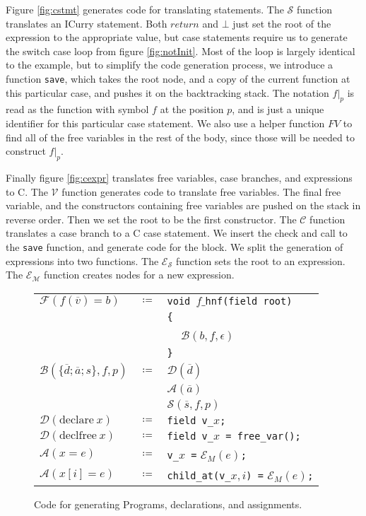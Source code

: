 \documentclass{book}
\theoremstyle{definition}
\newcommand{\Varid}[1]{\mathit{#1}}
\begin{document}
Figure \ref{fig:cstmt} generates code for translating statements.
The $\mathcal{S}$ function translates an ICurry statement.
Both \ensuremath{\Varid{return}} and \ensuremath{\bot } just set the root of the expression to the appropriate value,
but case statements require us to generate the switch case loop from figure \ref{fig:notInit}.
Most of the loop is largely identical to the example,
but to simplify the code generation process, we introduce a function \texttt{save},
which takes the root node, and a copy of the current function at this particular case,
and pushes it on the backtracking stack.
The notation $f\vert_p$ is read as the function with symbol $f$ at the position $p$,
and is just a unique identifier for this particular case statement.
We also use a helper function $FV$ to find all of the free variables in the rest of the body,
since those will be needed to construct $f\vert_p$.

Finally figure \ref{fig:cexpr} translates free variables, case branches, and expressions to C.
The $\mathcal{V}$  function generates code to translate free variables.
The final free variable, and the constructors containing free variables 
are pushed on the stack in reverse order.
Then we set the root to be the first constructor.
The $\mathcal{C}$  function translates a case branch to a C case statement.
We insert the check and call to the \texttt{save} function, and generate code for the block.
We split the generation of expressions into two functions.
The $\mathcal{E_S}$  function sets the root to an expression.
The $\mathcal{E_M}$  function creates nodes for a new expression.


\begin{figure}
\begin{tabular}{lcl}
$\mathcal{F}(f (\overline{v}) = b)$ & $\coloneqq$
 & \texttt{void }$f\_$\texttt{hnf(field root)}\\
 & & \texttt{\{}\\
 & & $\ \ \ \ $ $\mathcal{B}(b, f, \epsilon)$\\
 & & \texttt{\}}\\
$\mathcal{B}(\{\overline{d}; \overline{a}; s\}, f, p)$ & $\coloneqq $
 & $\mathcal{D}(\overline{d})$ \\
 & & $\mathcal{A}(\overline{a})$ \\
 & & $\mathcal{S}(\overline{s}, f, p)$\\
$\mathcal{D}(\text{declare}\ x)$ & $\coloneqq$ & \texttt{field v\_}$x$\texttt{;}\\
$\mathcal{D}(\text{declfree}\ x)$ & $\coloneqq$ & \texttt{field v\_}$x$\texttt{ = free\_var();}\\
$\mathcal{A}(x = e)$ & $\coloneqq$ & \texttt{v\_}$x$\texttt{ =} $\mathcal{E}_M(e)$\texttt{;}\\
$\mathcal{A}(x[i] = e)$ & $\coloneqq$ & \texttt{child\_at(v\_}$x,i$\texttt{) =} $\mathcal{E}_M(e)$\texttt{;}\\
\end{tabular}
\caption{Code for generating Programs, declarations, and assignments.}
\label{fig:cprog}
\end{figure}
\end{document}
